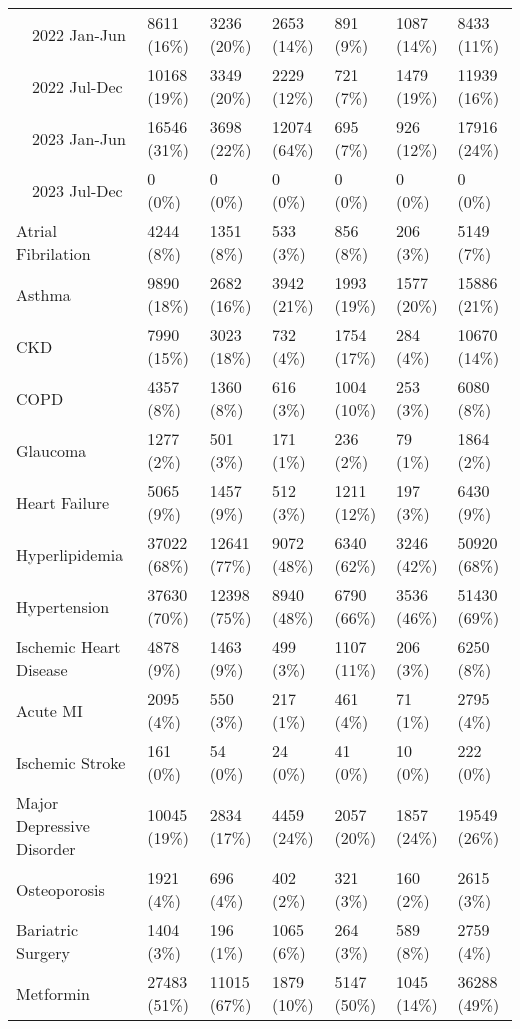 \begin{longtable}{p{}p{}p{}p{}p{}p{}p{}}
    2022 Jan-Jun & 8611 (16\%) & 3236 (20\%) & 2653 (14\%) & 891 (9\%) & 1087 (14\%) & 8433 (11\%) \\ 
    2022 Jul-Dec & 10168 (19\%) & 3349 (20\%) & 2229 (12\%) & 721 (7\%) & 1479 (19\%) & 11939 (16\%) \\ 
    2023 Jan-Jun & 16546 (31\%) & 3698 (22\%) & 12074 (64\%) & 695 (7\%) & 926 (12\%) & 17916 (24\%) \\ 
    2023 Jul-Dec & 0 (0\%) & 0 (0\%) & 0 (0\%) & 0 (0\%) & 0 (0\%) & 0 (0\%) \\ 
  Atrial Fibrilation & 4244 (8\%) & 1351 (8\%) & 533 (3\%) & 856 (8\%) & 206 (3\%) & 5149 (7\%) \\ 
  Asthma & 9890 (18\%) & 2682 (16\%) & 3942 (21\%) & 1993 (19\%) & 1577 (20\%) & 15886 (21\%) \\ 
  CKD & 7990 (15\%) & 3023 (18\%) & 732 (4\%) & 1754 (17\%) & 284 (4\%) & 10670 (14\%) \\ 
  COPD & 4357 (8\%) & 1360 (8\%) & 616 (3\%) & 1004 (10\%) & 253 (3\%) & 6080 (8\%) \\ 
  Glaucoma & 1277 (2\%) & 501 (3\%) & 171 (1\%) & 236 (2\%) & 79 (1\%) & 1864 (2\%) \\ 
  Heart Failure & 5065 (9\%) & 1457 (9\%) & 512 (3\%) & 1211 (12\%) & 197 (3\%) & 6430 (9\%) \\ 
  Hyperlipidemia & 37022 (68\%) & 12641 (77\%) & 9072 (48\%) & 6340 (62\%) & 3246 (42\%) & 50920 (68\%) \\ 
  Hypertension & 37630 (70\%) & 12398 (75\%) & 8940 (48\%) & 6790 (66\%) & 3536 (46\%) & 51430 (69\%) \\ 
  Ischemic Heart Disease & 4878 (9\%) & 1463 (9\%) & 499 (3\%) & 1107 (11\%) & 206 (3\%) & 6250 (8\%) \\ 
  Acute MI & 2095 (4\%) & 550 (3\%) & 217 (1\%) & 461 (4\%) & 71 (1\%) & 2795 (4\%) \\ 
  Ischemic Stroke & 161 (0\%) & 54 (0\%) & 24 (0\%) & 41 (0\%) & 10 (0\%) & 222 (0\%) \\ 
  Major Depressive Disorder & 10045 (19\%) & 2834 (17\%) & 4459 (24\%) & 2057 (20\%) & 1857 (24\%) & 19549 (26\%) \\ 
  Osteoporosis & 1921 (4\%) & 696 (4\%) & 402 (2\%) & 321 (3\%) & 160 (2\%) & 2615 (3\%) \\ 
  Bariatric Surgery & 1404 (3\%) & 196 (1\%) & 1065 (6\%) & 264 (3\%) & 589 (8\%) & 2759 (4\%) \\ 
  Metformin & 27483 (51\%) & 11015 (67\%) & 1879 (10\%) & 5147 (50\%) & 1045 (14\%) & 36288 (49\%) \\ 

\end{longtable}
